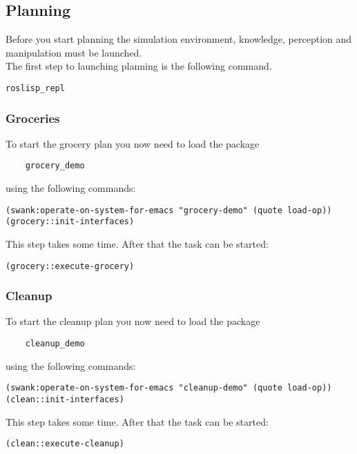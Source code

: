 \documentclass[main.tex]{subfiles}
\begin{document}
	\subsection{Planning}
	Before you start planning the simulation environment, knowledge, perception and manipulation must be launched.\\
	The first step to launching planning is the following command.\\
	\begin{lstlisting}
roslisp_repl
\end{lstlisting}

	\subsubsection{Groceries}
	To start the grocery plan you now need to load the package\\ \begin{verbatim}
	grocery_demo
	\end{verbatim}
	 using the following commands:
	\begin{lstlisting}
(swank:operate-on-system-for-emacs "grocery-demo" (quote load-op))
(grocery::init-interfaces)
\end{lstlisting}
This step takes some time. After that the task can be started:\\
\begin{lstlisting}
(grocery::execute-grocery)
\end{lstlisting}

	\subsubsection{Cleanup}
	To start the cleanup plan you now need to load the package\\ \begin{verbatim}
	cleanup_demo
	\end{verbatim}
	 using the following commands:\\
	\begin{lstlisting}
(swank:operate-on-system-for-emacs "cleanup-demo" (quote load-op))
(clean::init-interfaces)
\end{lstlisting}
This step takes some time. After that the task can be started:\\
\begin{lstlisting}
(clean::execute-cleanup)
\end{lstlisting}
\end{document}

